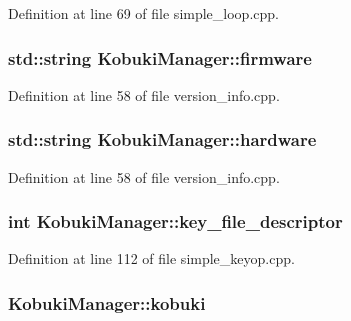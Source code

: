 \-Definition at line 69 of file simple\-\_\-loop.\-cpp.

\subsubsection[{firmware}]{\setlength{\rightskip}{0pt plus 5cm}std\-::string {\bf \-Kobuki\-Manager\-::firmware}\hspace{0.3cm}{\ttfamily  [private]}}\label{classKobukiManager_add3c2b016571059102d52edcbf8b63ac}


\-Definition at line 58 of file version\-\_\-info.\-cpp.

\subsubsection[{hardware}]{\setlength{\rightskip}{0pt plus 5cm}std\-::string {\bf \-Kobuki\-Manager\-::hardware}\hspace{0.3cm}{\ttfamily  [private]}}\label{classKobukiManager_a36968fe38609a51c9949e7c6aada04f1}


\-Definition at line 58 of file version\-\_\-info.\-cpp.

\subsubsection[{key\-\_\-file\-\_\-descriptor}]{\setlength{\rightskip}{0pt plus 5cm}int {\bf \-Kobuki\-Manager\-::key\-\_\-file\-\_\-descriptor}\hspace{0.3cm}{\ttfamily  [private]}}\label{classKobukiManager_a19de82ae84137213a53e50ea58218a32}


\-Definition at line 112 of file simple\-\_\-keyop.\-cpp.

\subsubsection[{kobuki}]{ {\bf \-Kobuki\-Manager\-::kobuki}\hspace{0.3cm}{\ttfamily  [private]}}\label{classKobukiManager_aedbd8a41454f86c36938b15481688d4c}


